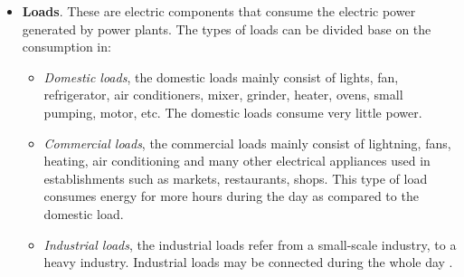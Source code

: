 \begin{itemize}
    
    \item \textbf{Loads}. These are electric components that consume the electric power generated by power plants. The types of loads can be divided base on the consumption in:
    \begin{itemize}
        \item[] \emph{Domestic loads}, the domestic loads mainly consist of lights, fan, refrigerator, air conditioners, mixer, grinder, heater, ovens, small pumping, motor, etc. The domestic loads consume very little power.
        \item[] \emph{Commercial loads}, the commercial loads mainly consist of lightning, fans, heating, air conditioning and many other electrical appliances used in establishments such as markets, restaurants, shops. This type of load consumes energy for more hours during the day as compared to the domestic load.
        \item[] \emph{Industrial loads}, the industrial loads refer from a small-scale industry, to a heavy industry. Industrial loads may be connected during the whole day \cite{EDNdesign}.
    \end{itemize}
    
\end{itemize}

